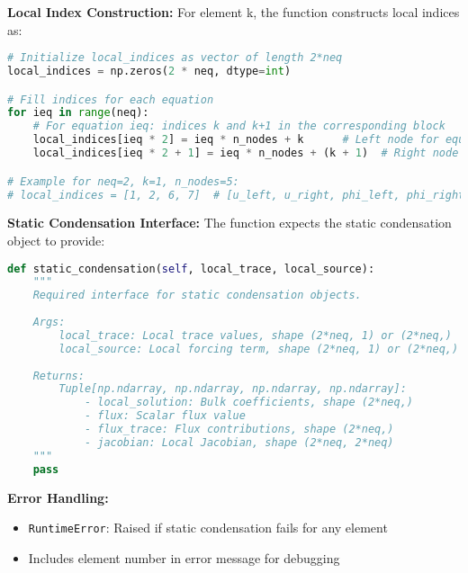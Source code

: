 \textbf{Local Index Construction:} For element k, the function constructs local indices as:
\begin{lstlisting}[language=Python, caption=Local Index Construction Algorithm]
# Initialize local_indices as vector of length 2*neq
local_indices = np.zeros(2 * neq, dtype=int)

# Fill indices for each equation
for ieq in range(neq):
    # For equation ieq: indices k and k+1 in the corresponding block
    local_indices[ieq * 2] = ieq * n_nodes + k      # Left node for equation ieq
    local_indices[ieq * 2 + 1] = ieq * n_nodes + (k + 1)  # Right node for equation ieq

# Example for neq=2, k=1, n_nodes=5:
# local_indices = [1, 2, 6, 7]  # [u_left, u_right, phi_left, phi_right]
\end{lstlisting}

\textbf{Static Condensation Interface:} The function expects the static condensation object to provide:
\begin{lstlisting}[language=Python, caption=Required Static Condensation Interface]
def static_condensation(self, local_trace, local_source):
    """
    Required interface for static condensation objects.
    
    Args:
        local_trace: Local trace values, shape (2*neq, 1) or (2*neq,)
        local_source: Local forcing term, shape (2*neq, 1) or (2*neq,)
        
    Returns:
        Tuple[np.ndarray, np.ndarray, np.ndarray, np.ndarray]:
            - local_solution: Bulk coefficients, shape (2*neq,)
            - flux: Scalar flux value
            - flux_trace: Flux contributions, shape (2*neq,)
            - jacobian: Local Jacobian, shape (2*neq, 2*neq)
    """
    pass
\end{lstlisting}

\textbf{Error Handling:}
\begin{itemize}
    \item \texttt{RuntimeError}: Raised if static condensation fails for any element
    \item Includes element number in error message for debugging
\end{itemize}

